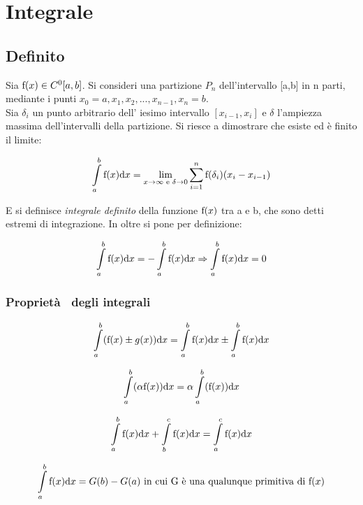  \section{Integrale}

\subsection{Definito}

Sia $\text{f}(x)\in C^0[a,b]$. Si consideri una partizione $P_n$ dell'intervallo [a,b] in n parti, mediante i punti $x_0=a,x_1,x_2,...,x_{n-1},x_n=b$.\\ 
Sia $\delta_i$ un punto arbitrario dell' iesimo intervallo $[x_{i-1},x_i]$ e $\delta$ l'ampiezza massima dell'intervalli della partizione. Si riesce a dimostrare che esiste ed è finito il limite:

\[
\int\limits_a^b{\text{\text{f}}(x){\rm d}x}=\mathop{\lim}\limits_{x \to \infty \text{ e }
\delta \to0}
\sum\limits_{i=1}^n {\text{\text{f}}(\delta_i)(x_i-x_{i-1})}
\]

E si definisce \textit{integrale definito} della funzione $\text{f}(x)$ tra a e b, che sono detti estremi di integrazione. In oltre si pone per definizione:

\[
\int\limits_a^b{\text{\text{f}}(x){\rm d}x}=-\int\limits_a^b{\text{\text{f}}(x){\rm d}x}\Rightarrow\int\limits_a^b{\text{\text{f}}(x){\rm d}x}=0
\]

\subsubsection{Proprietà  degli integrali}

\begin{form}
		  \[
		  \int\limits_a^b({\text{\text{f}}(x)\pm g(x)){\rm d}x}=\int\limits_a^b{\text{\text{f}}(x)}{\rm d}x\pm
\int\limits_a^b{\text{\text{f}}(x)}{\rm d}x
		  \]
		  \end{form}
		  
		  \begin{form}[Costante]
		  \[
		  \int\limits_a^b(\alpha{\text{\text{f}}(x)){\rm d}x}=\alpha\int\limits_a^b({\text{\text{f}}(x)){\rm d}x}
		  \]
		  \end{form}

\begin{form}
		  \[
		  \int\limits_a^b{\text{\text{f}}(x){\rm d}x}+\int\limits_b^c{\text{\text{f}}(x){\rm d}x}=\int\limits_a^c{\text{\text{f}}(x)}{\rm d}x
		  \]
		  \end{form}
		  
		  \begin{thm}
		  \[
		  \int\limits_a^b{\text{\text{f}}(x){\rm d}x}=G(b)-G(a)\text{ in cui G è una qualunque primitiva di }\text{f}(x)
		  \]
		  \end{thm}

